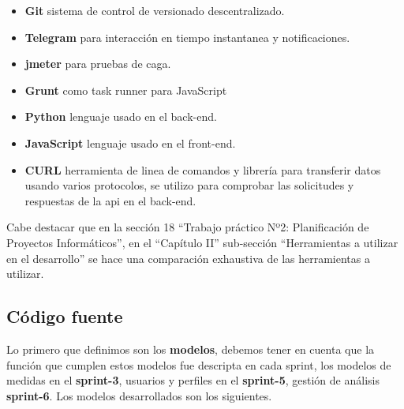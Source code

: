\begin{itemize}
\item \textbf{Git} sistema de control de versionado descentralizado.
\item \textbf{Telegram} para interacción en tiempo instantanea y notificaciones.
\item \textbf{jmeter} para pruebas de caga.
\item \textbf{Grunt} como task runner para JavaScript
\item \textbf{Python} lenguaje usado en el back-end.
\item \textbf{JavaScript} lenguaje usado en el front-end.
\item \textbf{CURL}  herramienta de linea de comandos y librería para transferir datos usando varios protocolos, se utilizo para comprobar las solicitudes y respuestas de la api en el back-end.
\end{itemize}

Cabe destacar que en la sección 18 ``Trabajo práctico Nº2: Planificación de Proyectos Informáticos'', en el ``Capítulo II'' sub-sección ``Herramientas a utilizar en el desarrollo'' se hace una comparación exhaustiva de las herramientas a utilizar. 

\subsection{Código fuente}
\label{codigo}
Lo primero que definimos son los \textbf{modelos}, debemos tener en cuenta que la función que cumplen estos modelos fue descripta en cada sprint, los modelos de medidas en el \textbf{sprint-3}, usuarios y perfiles en el \textbf{sprint-5}, gestión de análisis \textbf{sprint-6}. Los modelos desarrollados son los siguientes.

